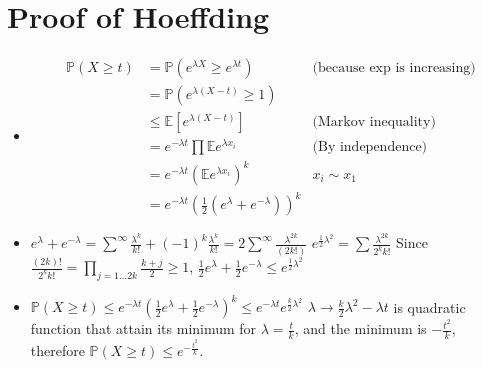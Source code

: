 \documentclass[12pt]{article}
\newcommand{\esp}{{\mathbb E}}
\newcommand{\pr}{{\mathbb P}}
\begin{document}
\section{Proof of Hoeffding}
  
\begin{itemize}
\item
  \begin{align*}
    \pr( X \ge t) &= \pr( e^{\lambda X} \ge e^{\lambda t}) &\text{(because $\exp$ is increasing)}
    \\& =  \pr( e^{\lambda (X - t)} \ge 1)
    \\&\le \esp[e^{\lambda (X - t)} ] &\text{(Markov inequality)}
    \\&= e^{-\lambda t} \prod \esp e^{\lambda x_i} &\text{(By independence)}
    \\& = e^{-\lambda t} (\esp e^{\lambda x_i})^k &x_i \sim x_1
    \\& = e^{-\lambda t} (\frac12 (e^{\lambda} + e^{-\lambda}))^k 
  \end{align*}
\item
  $e^{\lambda} + e^{-\lambda} = \sum^{\infty} \frac{\lambda^k}{k!} + (-1)^k \frac{\lambda^k}{k!} = 2 \sum^{\infty}  \frac{\lambda^{2k}}{(2k!)}$
  $e^{\frac12 \lambda^2} = \sum \frac{\lambda^{2k}}{2^k k!}$
  Since $\frac{(2k)!}{2^kk!} = \prod_{j = 1 \ldots 2k} \frac{k+j}{2} \ge 1$, $\frac12 e^{\lambda} + \frac12 e^{-\lambda} \le e^{\frac12 \lambda^2}$

\item $\pr(X \ge t) \le e^{-\lambda t} (\frac12 e^{\lambda} + \frac12 e^{-\lambda})^k \le e^{-\lambda t} e^{\frac k2 \lambda^2}$
  $\lambda \rightarrow \frac k2 \lambda^2 - \lambda t$ is quadratic function that attain its minimum for $\lambda = \frac tk$, and the minimum is $-\frac{t^2}k$, therefore $\pr(X \ge t) \le e^{-\frac{t^2}k}$.
\end{itemize}
\end{document}
